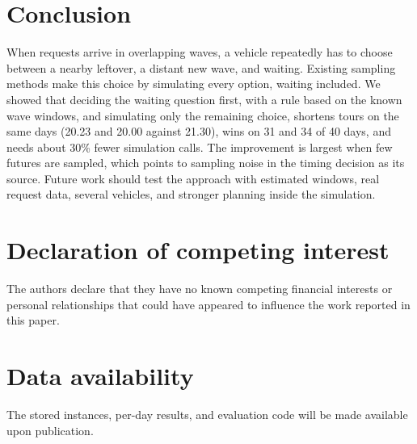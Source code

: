 \documentclass[5p,times,authoryear]{elsarticle}
\begin{document}
\section{Conclusion}
\label{sec:conclusion}

When requests arrive in overlapping waves, a vehicle repeatedly has to choose between a nearby leftover, a distant new wave, and waiting. Existing sampling methods make this choice by simulating every option, waiting included. We showed that deciding the waiting question first, with a rule based on the known wave windows, and simulating only the remaining choice, shortens tours on the same days (20.23 and 20.00 against 21.30), wins on 31 and 34 of 40 days, and needs about 30\% fewer simulation calls. The improvement is largest when few futures are sampled, which points to sampling noise in the timing decision as its source. Future work should test the approach with estimated windows, real request data, several vehicles, and stronger planning inside the simulation.

\section*{Declaration of competing interest}
The authors declare that they have no known competing financial interests or personal relationships that could have appeared to influence the work reported in this paper.

\section*{Data availability}
The stored instances, per-day results, and evaluation code will be made available upon publication.

\FloatBarrier


\end{document}
